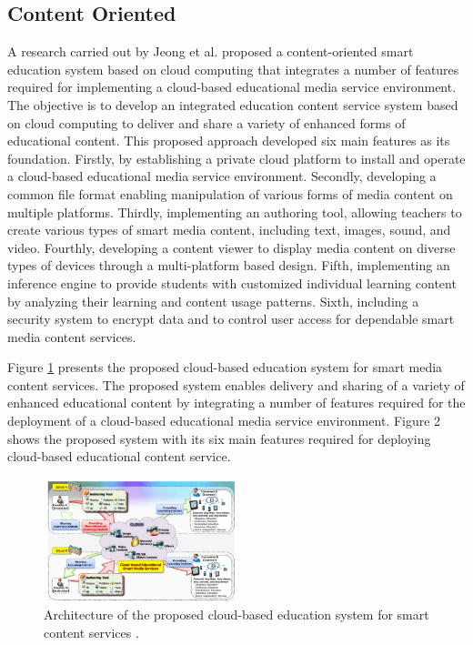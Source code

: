 \documentclass[journal]{vgtc}
\begin{document}
  \subsection{Content Oriented}
  A research carried out by Jeong et al. \cite{jeong2013content,jeong2013cloud} proposed a content-oriented smart education system based on cloud computing that integrates a number of features required for implementing a cloud-based educational media service environment. The objective is to develop an integrated education content service system based on cloud computing to deliver and share a variety of enhanced forms of educational content. This proposed approach developed six main features as its foundation. Firstly, by establishing a private cloud platform to install and operate a cloud-based educational media service environment. Secondly, developing a common file format enabling manipulation of various forms of media content on multiple platforms. Thirdly, implementing an authoring tool, allowing teachers to create various types of smart media content, including text, images, sound, and video. Fourthly, developing a content viewer to display media content on diverse types of devices through a multi-platform based design. Fifth, implementing an inference engine to provide students with customized individual learning content by analyzing their learning and content usage patterns. Sixth, including a security system to encrypt data and to control user access for dependable smart media content services.

  Figure \ref{archi} presents the proposed cloud-based education system for smart media content services. The proposed system enables delivery and sharing of a variety of enhanced educational content by integrating a number of features required for the deployment of a cloud-based educational media service environment. Figure 2 shows the proposed system with its six main features required for deploying cloud-based educational content service.

  \begin{figure}[t]
    \centering
    \includegraphics[width=0.5\textwidth]{content-oriented-archi}
    \caption{Architecture of the proposed cloud-based education system for smart content services \cite{jeong2013content}.}
    \label{archi}
  \end{figure}
\end{document}
